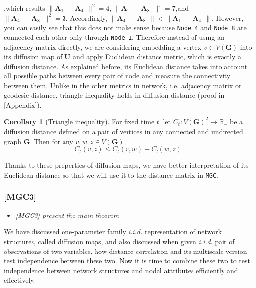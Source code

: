 \documentclass[12pt]{article}
\theoremstyle{definition}
\newtheorem{corollary}{Corollary}[theorem]
\begin{document}
,which results $\parallel \boldsymbol{A}_{1 \cdot} -\boldsymbol{A}_{4 \cdot} \parallel^2 = 4$, $\parallel \boldsymbol{A}_{1 \cdot} -\boldsymbol{A}_{8 \cdot} \parallel^2 = 7$,and $\parallel \boldsymbol{A}_{4 \cdot} -\boldsymbol{A}_{8 \cdot} \parallel^2 = 3.$ Accordingly, $\parallel \boldsymbol{A}_{4 \cdot} -\boldsymbol{A}_{8 \cdot} \parallel  < \parallel \boldsymbol{A}_{1 \cdot} -\boldsymbol{A}_{4 \cdot} \parallel$. However, you can easily see that this does not make sense because \texttt{Node 4} and \texttt{Node 8} are connected each other only through \texttt{Node 1}. 
Therefore instead of using an adjacency matrix directly, we are considering embedding a vertex $v \in V(\boldsymbol{G})$ into its diffusion map of $\boldsymbol{U}$ and apply Euclidean distance metric, which is exactly a diffusion distance. As explained before, its Euclidean distance takes into account all possible paths between every pair of node and measure the connectivity between them. Unlike in the other metrics in network, i.e. adjacency matrix or geodesic distance, triangle inequality holds in diffusion distance (proof in [Appendix]). 

\begin{corollary}[Triangle inequality]
\label{corollary1}
For fixed time $t$, let $C_{t} : V(\mathbf{G})^2 \rightarrow \mathbb{R}_{+}$ be a diffusion distance defined on a pair of vertices in any connected and undirected graph $\mathbf{G}$. Then for any $v, w, z \in V(\mathbf{G})$,  
\begin{equation}
C_{t}(v,z) \leq C_{t}(v,w) + C_{t}(w,z)
\end{equation}
\end{corollary}	

Thanks to these properties of diffusion maps, we have better interpretation of its Euclidean distance so that we will use it to the distance matrix in \texttt{MGC}.



\subsubsection{[MGC3]}
\begin{itemize}
	\item {\it  [MGC3] present the main theorem  \/}
\end{itemize}

We have discussed one-parameter family \textit{i.i.d.} representation of network structures, called diffusion maps, and also discussed when given \textit{i.i.d}. pair of observations of two variables, how distance correlation and its multiscale version test independence between these two. Now it is time to combine these two to test independence between network structures and nodal attributes efficiently and effectively.
\end{document}
